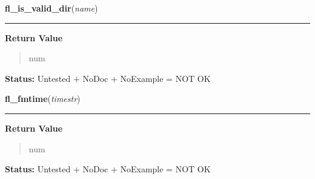 \hspace{.8\funcindent}\begin{boxedminipage}{\funcwidth}

    \raggedright \textbf{fl\_is\_valid\_dir}(\textit{name})

    \vspace{-1.5ex}

    \rule{\textwidth}{0.5\fboxrule}
\setlength{\parskip}{2ex}
\setlength{\parskip}{1ex}
      \textbf{Return Value}
    \vspace{-1ex}

      \begin{quote}
      num

      \end{quote}

\textbf{Status:} Untested + NoDoc + NoExample = NOT OK



    \end{boxedminipage}

    \label{xformslib:library:fl_fmtime}

    \vspace{0.5ex}

\hspace{.8\funcindent}\begin{boxedminipage}{\funcwidth}

    \raggedright \textbf{fl\_fmtime}(\textit{timestr})

    \vspace{-1.5ex}

    \rule{\textwidth}{0.5\fboxrule}
\setlength{\parskip}{2ex}
\setlength{\parskip}{1ex}
      \textbf{Return Value}
    \vspace{-1ex}

      \begin{quote}
      num

      \end{quote}

\textbf{Status:} Untested + NoDoc + NoExample = NOT OK



    \end{boxedminipage}

    \label{xformslib:library:fl_fix_dirname}

